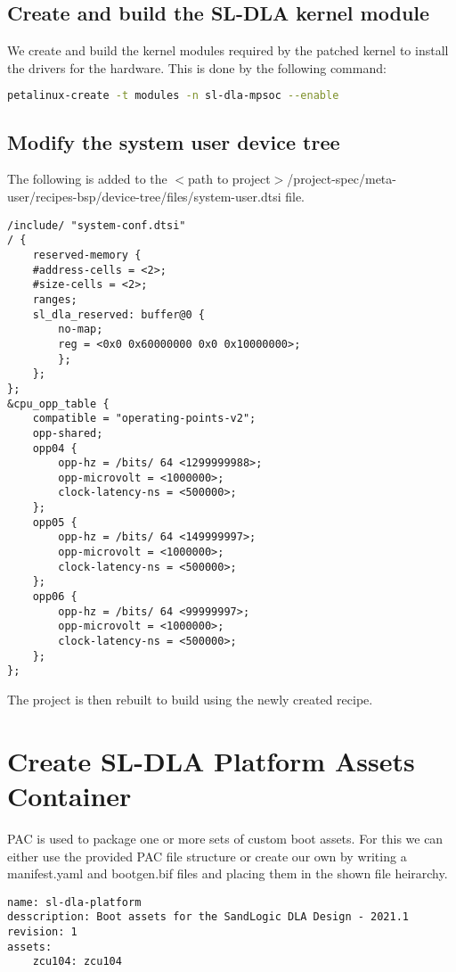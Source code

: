 \documentclass{article}
\begin{document}
\subsection{Create and build the SL-DLA kernel module}
We create and build the kernel modules required by the patched kernel to install the drivers for the hardware.
This is done by the following command:
\begin{lstlisting}[language=bash]
petalinux-create -t modules -n sl-dla-mpsoc --enable
\end{lstlisting}

\subsection{Modify the system user device tree}
The following is added to the $<$path to project$>$/project-spec/meta-user/recipes-bsp/device-tree/files/system-user.dtsi
file.
\begin{lstlisting}
/include/ "system-conf.dtsi"
/ {
    reserved-memory {
    #address-cells = <2>;
    #size-cells = <2>;
    ranges;
    sl_dla_reserved: buffer@0 {
        no-map;
        reg = <0x0 0x60000000 0x0 0x10000000>;
        };
    };
};
&cpu_opp_table {
    compatible = "operating-points-v2";
    opp-shared;
    opp04 {
        opp-hz = /bits/ 64 <1299999988>;
        opp-microvolt = <1000000>;
        clock-latency-ns = <500000>;
    };
    opp05 {
        opp-hz = /bits/ 64 <149999997>;
        opp-microvolt = <1000000>;
        clock-latency-ns = <500000>;
    };
    opp06 {
        opp-hz = /bits/ 64 <99999997>;
        opp-microvolt = <1000000>;
        clock-latency-ns = <500000>;
    };
};
\end{lstlisting}

The project is then rebuilt to build using the newly created recipe.

\section{Create SL-DLA Platform Assets Container}
PAC is used to package one or more sets of custom boot assets. For this we can either use the provided PAC file
structure or create our own by writing a manifest.yaml and bootgen.bif files and placing them in the shown file
heirarchy.

\begin{lstlisting}[caption=manifest.yaml]
name: sl-dla-platform
desscription: Boot assets for the SandLogic DLA Design - 2021.1
revision: 1
assets:
    zcu104: zcu104
\end{lstlisting}
\end{document}
